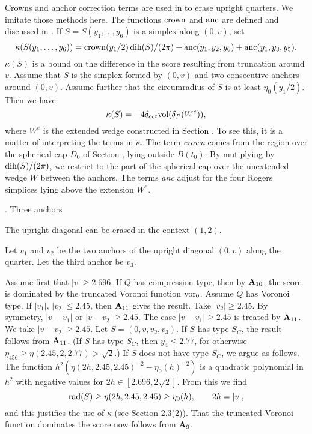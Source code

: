 Crowns and anchor correction terms are used in \cite{F} to
erase upright quarters.  We imitate those methods here.
The functions $\operatorname{crown}$ and $\operatorname{anc}$ are defined and discussed
in \cite{F.4}.  
If $S=S(y_1,\ldots,y_6)$ is a simplex along $(0,v)$, set
$$\kappa(S(y_1,\ldots,y_6))=\operatorname{crown}(y_1/2)\operatorname{dih}(S)/(2\pi) +
	\operatorname{anc}(y_1,y_2,y_6)+\operatorname{anc}(y_1,y_3,y_5).$$
 $\kappa(S)$ is a bound on the difference in the 
score resulting from truncation around $v$.  
Assume that $S$ is the simplex formed by $(0,v)$ and two consecutive anchors
around $(0,v)$. Assume further that the circumradius of $S$ is at least
$\eta_0(y_1/2)$.  Then we have
$$\kappa(S) = -4\delta_{oct} \hbox{vol}(\delta_P(W^e)),$$
where $W^e$ is the extended wedge constructed in Section .
To see this, it is a matter of interpreting the terms in $\kappa$.
The term {\it crown\/} comes from the region over the spherical cap $D_0$ of 
Section ,
lying outside $B(t_0)$.  By mutiplying by $\operatorname{dih}(S)/(2\pi)$, we
restrict to the part of the spherical cap over the unextended wedge
$W$ between the anchors.  The terms {\it anc\/} adjust for the four
Rogers simplices lying above the extension $W^e$.


\subhead {}. Three anchors\endsubhead
\smallskip

  The upright diagonal can be erased
in the context $(1,2)$.
\endproclaim


Let $v_1$ and $v_2$ be the two anchors of the upright
diagonal $(0,v)$ along the quarter. Let the third
anchor be $v_3$.

Assume first that $|v|\ge 2.696$.
 If $Q$ has compression type, then
by ${\bold A}_{10}$, the score is dominated
by the truncated Voronoi function $\operatorname{vor}_0$.  Assume $Q$ has Voronoi type.
If $|v_1|$, $|v_2|\le 2.45$, then ${\bold A}_{11}$ gives the result.
Take $|v_2|\ge 2.45$.  By symmetry, $|v-v_1|$ or $|v-v_2|\ge 2.45$.
The case $|v-v_1|\ge2.45$ is treated by ${\bold A}_{11}$.
We take $|v-v_2|\ge2.45$.
Let $S=(0,v,v_2,v_3)$.  
If $S$ has type $S_C$,
the result follows from ${\bold A}_{11}$.  
(If $S$ has type $S_C$, then $y_4\le 2.77$, 
for otherwise $\eta_{456}\ge\eta(2.45,2,2.77)>\sqrt2$.)
If $S$ does not have type $S_C$, we argue
as follows.
The function $h^2(\eta(2h,2.45,2.45)^{-2}-\eta_0(h)^{-2})$ is 
a quadratic polynomial in $h^2$ with negative values for
$2h\in[2.696,2\sqrt{2}]$.
From this we find 
$$\operatorname{rad}(S)\ge \eta(2h,2.45,2.45) \ge \eta_0(h),\qquad 2h=|v|,$$
and this justifies the use of $\kappa$ (see Section 2.3(2)).
That the truncated Voronoi function dominates the score now follows
from ${\bold A}_9$.

